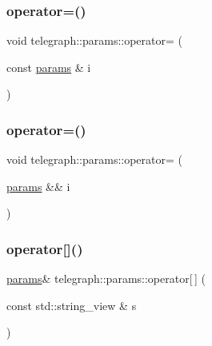 \subsubsection{\texorpdfstring{operator=()}{operator=()}\hspace{0.1cm}{\footnotesize\ttfamily [1/2]}}
{\footnotesize\ttfamily void telegraph\+::params\+::operator= (\begin{DoxyParamCaption}\item[{const \hyperlink{classtelegraph_1_1params}{params} \&}]{i }\end{DoxyParamCaption})\hspace{0.3cm}{\ttfamily [inline]}}

\mbox{\label{classtelegraph_1_1params_a7ad928fc3d3fbabe7d61762e704cc89f}} 
\subsubsection{\texorpdfstring{operator=()}{operator=()}\hspace{0.1cm}{\footnotesize\ttfamily [2/2]}}
{\footnotesize\ttfamily void telegraph\+::params\+::operator= (\begin{DoxyParamCaption}\item[{\hyperlink{classtelegraph_1_1params}{params} \&\&}]{i }\end{DoxyParamCaption})\hspace{0.3cm}{\ttfamily [inline]}}

\mbox{\label{classtelegraph_1_1params_ae33b9535de4e28e9b4d6631cccbce970}} 
\subsubsection{\texorpdfstring{operator[]()}{operator[]()}}
{\footnotesize\ttfamily \hyperlink{classtelegraph_1_1params}{params}\& telegraph\+::params\+::operator\mbox{[}$\,$\mbox{]} (\begin{DoxyParamCaption}\item[{const std\+::string\+\_\+view \&}]{s }\end{DoxyParamCaption})\hspace{0.3cm}{\ttfamily [inline]}}

